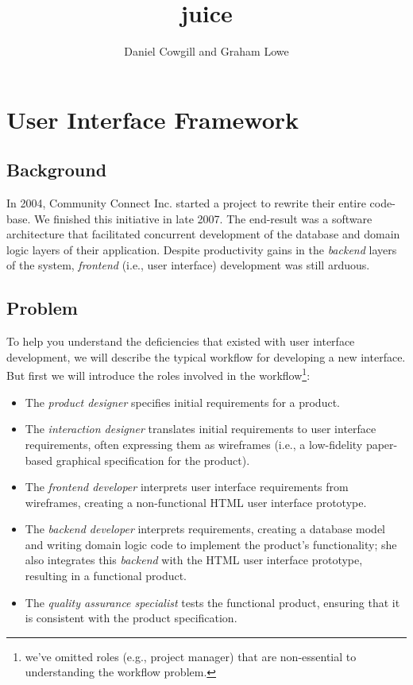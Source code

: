 \documentclass[10pt, twocolumn]{article}
\author{Daniel Cowgill and Graham Lowe}
\title{juice}
\begin{document}
\maketitle

\section{User Interface Framework}

\subsection{Background}

In 2004, Community Connect Inc. started a project to rewrite their
entire code-base. We finished this initiative in late 2007. The
end-result was a software architecture that facilitated concurrent
development of the database and domain logic layers of their
application. Despite productivity gains in the \emph{backend}
layers of the system, \emph{frontend} (i.e., user interface)
development was still arduous.

\subsection{Problem}

To help you understand the deficiencies that existed with user
interface development, we will describe the typical workflow for
developing a new interface. But first we will introduce the roles
involved in the workflow\footnote{we've omitted roles (e.g.,
  project manager) that are non-essential to understanding the
  workflow problem.}:

\begin{itemize}
\item The \emph{product designer} specifies initial requirements
  for a product.
\item The \emph{interaction designer} translates initial
  requirements to user interface requirements, often expressing
  them as wireframes (i.e., a low-fidelity paper-based graphical
  specification for the product).
\item The \emph{frontend developer} interprets user interface
  requirements from wireframes, creating a non-functional HTML
  user interface prototype.
\item The \emph{backend developer} interprets requirements,
  creating a database model and writing domain logic code to
  implement the product's functionality; she also integrates this
  \emph{backend} with the HTML user interface prototype, resulting
  in a functional product.
\item The \emph{quality assurance specialist} tests the functional
  product, ensuring that it is consistent with the product
  specification.
\end{itemize}
\end{document}
